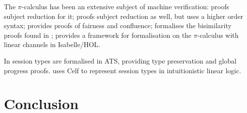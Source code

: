 \documentclass{mproj}
\newcommand{\picalc}{$\pi$-calculus}
\begin{document}
The \picalc{} has been an extensive subject of machine verification: \cite{Henry-Gerard1999} proofs subject reduction for it; \cite{Despeyroux2000} proofs subject reduction as well, but uses a higher order syntax; \cite{Affeldt2008} provides proofs of fairness and confluence; \cite{Honsell2001} formalises the bisimilarity proofs found in \cite{Walker1989}; \cite{Gay2001} provides a framework for formalisation on the \picalc{} with linear channels in Isabelle/HOL.

In \cite{Xi2016} session types are formalised in ATS, providing type preservation and global progress proofs. \cite{Bock2016} uses Celf to represent session types in intuitionistic linear logic.
\chapter{Conclusion}\label{conclusion}



\end{document}
